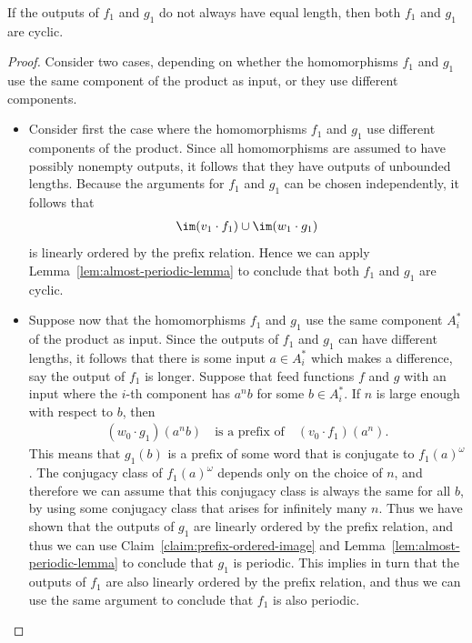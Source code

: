 \begin{lemma}
    If the outputs of $f_1$ and $g_1$ do not always have equal length, then both $f_1$ and $g_1$ are cyclic.
\end{lemma}
\begin{proof}
    Consider two cases, depending on whether the homomorphisms $f_1$ and $g_1$ use the same component of the product as input, or they use different components.
    
    \begin{itemize}
        \item 
    Consider first the case where  the homomorphisms $f_1$ and $g_1$ use different components of the product. Since all homomorphisms are assumed to have possibly nonempty outputs, it follows that they have outputs of unbounded lengths.  Because the arguments for $f_1$ and $g_1$ can be chosen independently, it follows that 
    \begin{align}
        \label{eq:prefix-ordered-image-union-two}
        \im (v_1 \cdot f_1) \cup \im (w_1 \cdot g_1)
    \end{align}
    is  linearly ordered by the prefix relation. Hence we can apply Lemma~\ref{lem:almost-periodic-lemma} to conclude that both $f_1$ and $g_1$ are cyclic. 

\item  Suppose now that the homomorphisms $f_1$ and $g_1$ use the same component $A^*_i$ of the product as input. Since the outputs of $f_1$ and $g_1$ can have different lengths, it follows that there is some input $a \in A_i^*$ which makes a difference, say the output of $f_1$ is longer.  Suppose that feed functions $f$ and $g$ with an input where the $i$-th component has $a^n b$ for some $b \in A_i^*$. If $n$ is large enough with respect to $b$, then 
    \begin{align*}
    (w_0 \cdot g_1)(a^nb) \quad \text{is a prefix of} \quad 
    (v_0 \cdot f_1)(a^n).
    \end{align*}
    This means that $g_1(b)$ is a prefix of some word that is conjugate to  $f_1(a)^\omega$. The conjugacy class of $f_1(a)^\omega$ depends only on the choice of $n$, and therefore we can assume that this conjugacy class is always the same for all $b$, by using some conjugacy class that arises for infinitely many $n$. Thus we have shown that the outputs of $g_1$ are linearly ordered by the prefix relation, and thus we can use Claim~\ref{claim:prefix-ordered-image}  and Lemma~\ref{lem:almost-periodic-lemma} to conclude that $g_1$ is periodic. This implies in turn that the outputs of $f_1$ are also linearly ordered by the prefix relation, and thus we can use the same argument to conclude that $f_1$ is also periodic. 
\end{itemize}




\end{proof}
